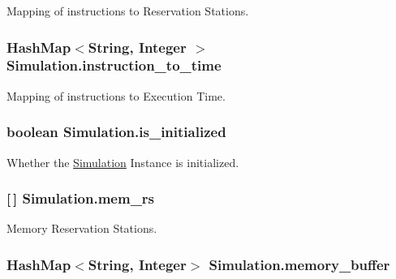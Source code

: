 \-Mapping of instructions to \-Reservation \-Stations. 

\hypertarget{classSimulation_aefb6ae75923bda2ea63a2789c6ea1387}{
\subsubsection[{instruction\-\_\-to\-\_\-time}]{\setlength{\rightskip}{0pt plus 5cm}\-Hash\-Map$<$\-String, \-Integer $>$ {\bf \-Simulation.\-instruction\-\_\-to\-\_\-time}}}\label{classSimulation_aefb6ae75923bda2ea63a2789c6ea1387}


\-Mapping of instructions to \-Execution \-Time. 

\hypertarget{classSimulation_a7c5a3018517be8966e7242ada10d5ba0}{
\subsubsection[{is\-\_\-initialized}]{\setlength{\rightskip}{0pt plus 5cm}boolean {\bf \-Simulation.\-is\-\_\-initialized}}}\label{classSimulation_a7c5a3018517be8966e7242ada10d5ba0}


\-Whether the \hyperlink{classSimulation}{\-Simulation} \-Instance is initialized. 

\hypertarget{classSimulation_a2d7653a8b926b1950e545b4ddf99525a}{
\subsubsection[{mem\-\_\-rs}]{ \mbox{[}$\,$\mbox{]} {\bf \-Simulation.\-mem\-\_\-rs}}}\label{classSimulation_a2d7653a8b926b1950e545b4ddf99525a}


\-Memory \-Reservation \-Stations. 

\hypertarget{classSimulation_ad6a6dd370a3221f0b89718c9b64e3dad}{
\subsubsection[{memory\-\_\-buffer}]{\setlength{\rightskip}{0pt plus 5cm}\-Hash\-Map$<$\-String, \-Integer$>$ {\bf \-Simulation.\-memory\-\_\-buffer}}}\label{classSimulation_ad6a6dd370a3221f0b89718c9b64e3dad}


